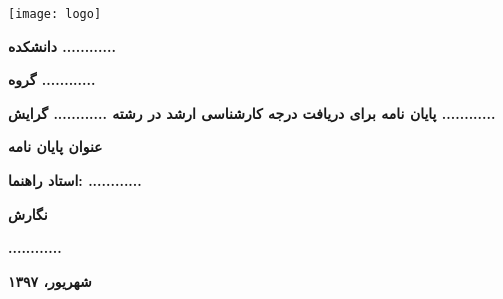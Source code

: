 \thispagestyle{empty}

\begin{center}
	\texttt{[image: logo]}

	\vspace{5mm}
	
	\large \textbf{دانشکده ............}
	
	\vspace{5mm}
	
	\large \textbf{گروه ............}

	\vspace{5mm}
	
	\large \textbf{پایان نامه برای دریافت درجه کارشناسی ارشد در رشته ............ گرایش ............}
	
	\vspace{15mm}
	
	\huge \textbf{عنوان پایان نامه}
	
	\vspace{15mm}
	
	\large \textbf{استاد راهنما: ............}
	
	\vspace{15mm}
	
	\large \textbf{نگارش}
	
	\vspace{5mm}
	
	\large \textbf{............}
	
	\vspace{15mm}
	
	\large \textbf{شهریور، ۱۳۹۷}
\end{center}
